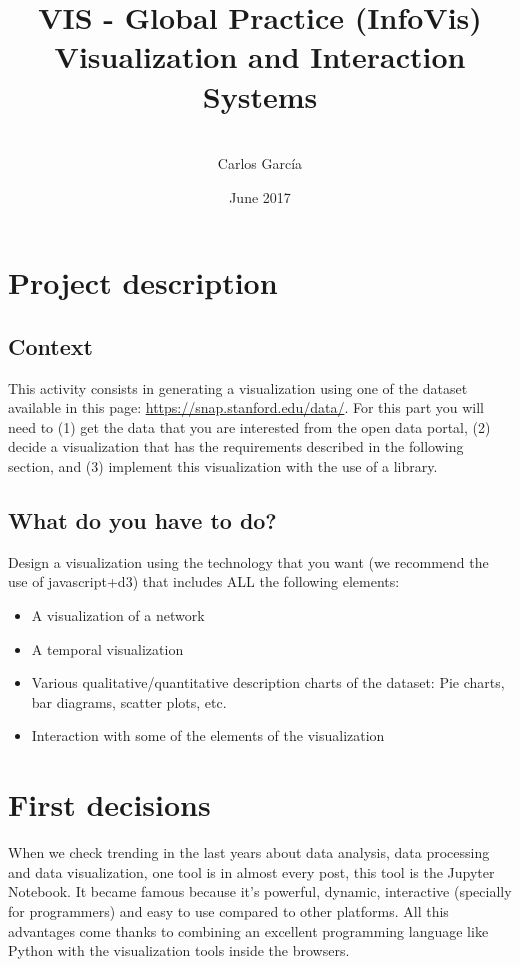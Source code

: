 \documentclass{article}
\title{VIS - Global Practice (InfoVis) \\ \bigskip Visualization and Interaction Systems}
\author{\\ Carlos García}
\date{June 2017}
\begin{document}
\maketitle \newpage \tableofcontents \newpage
\section{Project description}
  \subsection{Context}
    This activity consists in generating a visualization using one of the dataset available in this page: \url{https://snap.stanford.edu/data/}. For this part you will need to (1) get the data that you are interested from the open data portal, (2) decide a visualization that has the requirements described in the following section, and (3) implement this visualization with the use of a library.
  \subsection{What do you have to do?}
    Design a visualization using the technology that you want (we recommend the use of
    javascript+d3) that includes ALL the following elements:
    \begin{itemize}
      \item A visualization of a network
      \item A temporal visualization
      \item Various qualitative/quantitative description charts of the dataset: Pie charts, bar diagrams, scatter plots, etc.
      \item Interaction with some of the elements of the visualization
    \end{itemize}
\newpage
\section{First decisions}
  When we check trending in the last years about data analysis, data processing and data visualization, one tool is in almost every post, this tool is the Jupyter Notebook. It became famous because it's powerful, dynamic, interactive (specially for programmers) and easy to use compared to other platforms. All this advantages come thanks to combining an excellent programming language like Python with the visualization tools inside the browsers.
\end{document}
